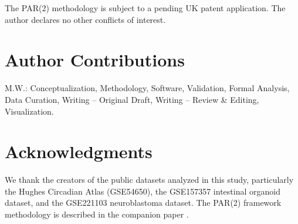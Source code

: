 \documentclass[11pt,letterpaper]{article}
\begin{document}
The PAR(2) methodology is subject to a pending UK patent application. The author declares no other conflicts of interest.

\section*{Author Contributions}

M.W.: Conceptualization, Methodology, Software, Validation, Formal Analysis, Data Curation, Writing -- Original Draft, Writing -- Review \& Editing, Visualization.

\section*{Acknowledgments}

We thank the creators of the public datasets analyzed in this study, particularly the Hughes Circadian Atlas (GSE54650), the GSE157357 intestinal organoid dataset, and the GSE221103 neuroblastoma dataset. The PAR(2) framework methodology is described in the companion paper \citep{whiteside2026paper1}.
\end{document}
